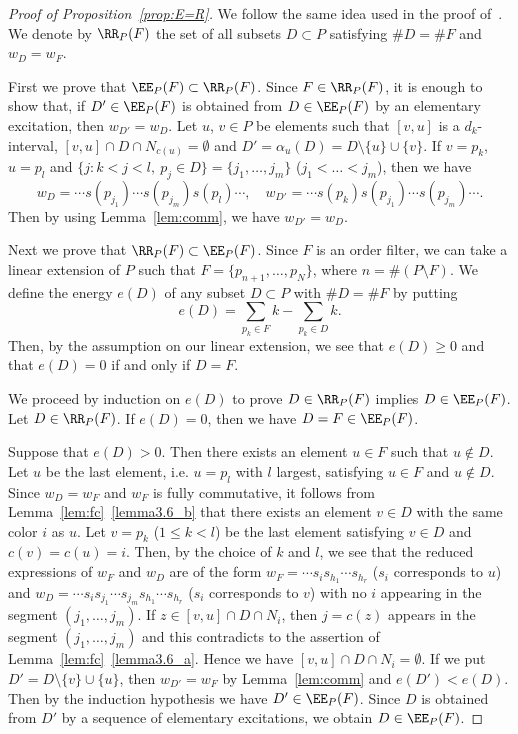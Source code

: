 \begin{proof}[Proof of Proposition~\ref{prop:E=R}]
We follow the same idea used in the proof of~\cite[Proposition~4.8]{GK}.
We denote by $\RR_P(F)$ the set of all subsets $D \subset P$ satisfying $\# D = \# F$ and $w_D = w_F$.

First we prove that $\EE_P(F) \subset \RR_P(F)$.
Since $F \in \RR_P(F)$, it is enough to show that, 
if $D' \in \EE_P(F)$ is obtained from $D \in \EE_P(F)$ by an elementary excitation, 
then $w_{D'} = w_D$.
Let $u$, $v \in P$ be elements such that $[v,u]$ is a $d_k$-interval, 
$[v,u] \cap D \cap N_{c(u)} = \emptyset$ and 
$D' = \alpha_u(D) = D \setminus \{ u \} \cup \{ v \}$.
If $v = p_k$, $u = p_l$ and $\{ j : k < j < l, \ p_j \in D \} = \{ j_1, \dots, j_m \}$ 
($j_1 < \dots < j_m$), then we have
$$
w_D = \cdots s(p_{j_1}) \cdots s(p_{j_m}) s(p_l) \cdots,
\quad
w_{D'} = \cdots s(p_k) s(p_{j_1}) \cdots s(p_{j_m}) \cdots.
$$
Then by using Lemma~\ref{lem:comm}, we have $w_{D'} = w_D$.

Next we prove that $\RR_P(F) \subset \EE_P(F)$.
Since $F$ is an order filter, we can take a linear extension of $P$ 
such that $F = \{ p_{n+1}, \ldots, p_N \}$, where $n = \# (P \setminus F)$.
We define the energy $e(D)$ of any subset $D \subset P$ with $\# D = \# F$ by putting
$$
e(D) = \sum_{p_k \in F} k - \sum_{p_k \in D} k.
$$
Then, by the assumption on our linear extension, 
we see that $e(D) \ge 0$ and that $e(D) = 0$ if and only if $D = F$.

We proceed by induction on $e(D)$ to prove $D \in \RR_P(F)$ implies $D \in \EE_P(F)$.
Let $D \in \RR_P(F)$.
If $e(D) = 0$, then we have $D = F \in \EE_P(F)$.

Suppose that $e(D) > 0$.
Then there exists an element $u \in F$ such that $u \not\in D$.
Let $u$ be the last element, i.e. $u = p_l$ with $l$ largest, 
satisfying $u \in F$ and $u \not\in D$.
Since $w_D = w_F$ and $w_F$ is fully commutative, it follows from Lemma~\ref{lem:fc}~\ref{lemma3.6_b} %
that there exists an element $v \in D$ with the same color $i$ as $u$.
Let $v = p_k$ ($1 \le k < l$) be the last element satisfying $v \in D$ and $c(v) = c(u) = i$.
Then, by the choice of $k$ and $l$, we see that the reduced expressions of $w_F$ and $w_D$
are of the form $w_F = \cdots s_i s_{h_1} \cdots s_{h_r}$ ($s_i$ corresponds to $u$) 
and $w_D = \cdots s_i s_{j_1} \cdots s_{j_m} s_{h_1} \cdots s_{h_r}$ ($s_i$ corresponds to $v$) 
with no $i$ appearing in the segment $(j_1, \dots, j_m)$.
If $z \in [v,u] \cap D \cap N_i$, then $j = c(z)$ appears in the segment $(j_1, \dots, j_m)$ 
and this contradicts to the assertion of Lemma~\ref{lem:fc}~\ref{lemma3.6_a}.
Hence we have $[v,u] \cap D \cap N_i = \emptyset$.
If we put $D' = D \setminus \{ v \} \cup \{ u \}$,
then $w_{D'} = w_F$ by Lemma~\ref{lem:comm} and $e(D') < e(D)$.
Then by the induction hypothesis we have $D' \in \EE_P(F)$.
Since $D$ is obtained from $D'$ by a sequence of elementary excitations, 
we obtain $D \in \EE_P(F)$.
\end{proof}

